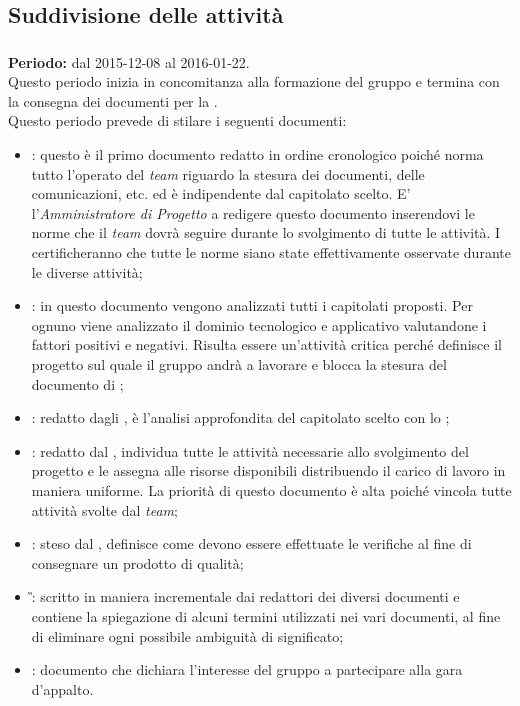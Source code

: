 \subsection{Suddivisione delle attività}

\subsubsection{\AR}
\textbf{Periodo:} dal 2015-12-08 al 2016-01-22.\\
Questo periodo inizia in concomitanza alla formazione del gruppo e termina con la consegna dei documenti per la \textbf{\RR}.\\ 
Questo periodo prevede di stilare i seguenti documenti:
\begin{itemize}
		\item \textit{\NdP}: questo è il primo documento redatto in ordine cronologico poiché norma tutto l'operato del \textit{team} riguardo la stesura dei documenti, delle comunicazioni, etc. ed è indipendente dal capitolato scelto. E' l’\textit{Amministratore di Progetto} a redigere questo documento inserendovi le norme che il \textit{team} dovrà seguire durante lo svolgimento di tutte le attività. I \textit{\Vers} certificheranno che tutte le norme siano state effettivamente osservate durante le diverse attività;
		\item \textit{\SdF}: in questo documento vengono analizzati tutti i capitolati proposti. Per ognuno viene analizzato il dominio tecnologico e applicativo valutandone i fattori positivi e negativi. Risulta essere un'attività	critica perché definisce il progetto sul quale il gruppo andrà a lavorare e blocca la stesura del documento di \textit{\AdR};
		\item \textit{\AdR}: redatto dagli \textit{\Anas}, è l'analisi approfondita del capitolato scelto con lo \textit{\SdF};
		\item \textit{\PdP}: redatto dal \textit{\RdP}, individua tutte le attività necessarie allo svolgimento del progetto e le assegna alle risorse disponibili distribuendo il carico di lavoro in maniera uniforme.
		La priorità di questo documento è alta poiché vincola tutte attività svolte dal \textit{team};
		\item \textit{\PdQ}: steso dal \textit{\Ver}, definisce come devono essere effettuate le verifiche al fine di consegnare un prodotto di qualità;
		\item \textit{\G}: scritto in maniera incrementale dai redattori dei diversi documenti e contiene la spiegazione di alcuni termini utilizzati nei vari documenti, al fine di eliminare ogni possibile ambiguità di significato;
		\item \textit{\LdP}: documento che dichiara l’interesse del gruppo a partecipare alla gara d’appalto.
\end{itemize}
